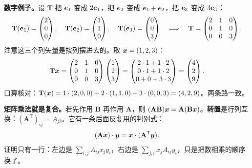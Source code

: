 \documentclass[11pt]{ctexart}
\newcommand{\ten}[1]{\mathbf{#1}}
\let\origsubhdr\subhdr
\renewcommand{\subhdr}[1]{\par\needspace{3\baselineskip}\origsubhdr{#1}}
\begin{document}
\textbf{数字例子。}设 $\ten T$ 把 $\boldsymbol{e}_1$ 变成 $2\boldsymbol{e}_1$，把 $\boldsymbol{e}_2$ 变成 $\boldsymbol{e}_1+\boldsymbol{e}_2$，把 $\boldsymbol{e}_3$ 变成 $3\boldsymbol{e}_3$：
\[
\ten T(\vect e_1)=\begin{pmatrix}2\\0\\0\end{pmatrix},\quad
\ten T(\vect e_2)=\begin{pmatrix}1\\1\\0\end{pmatrix},\quad
\ten T(\vect e_3)=\begin{pmatrix}0\\0\\3\end{pmatrix}
\quad\Longrightarrow\quad
\ten T=\begin{pmatrix}2&1&0\\0&1&0\\0&0&3\end{pmatrix}.
\]
注意这三个列矢量是按列摆进去的。取 $\boldsymbol{x}=(1,2,3)$：
\[
\ten T\vect x=\begin{pmatrix}2&1&0\\0&1&0\\0&0&3\end{pmatrix}\begin{pmatrix}1\\2\\3\end{pmatrix}
=\begin{pmatrix}2\cdot1+1\cdot2\\0\cdot1+1\cdot2\\0+0+3\cdot3\end{pmatrix}=\begin{pmatrix}4\\2\\9\end{pmatrix}.
\]
口算核对：$\ten T(\vect x)=1\cdot(2,0,0)+2\cdot(1,1,0)+3\cdot(0,0,3)=(4,2,9)$。两条路一致。

\textbf{矩阵乘法就是复合。}若先作用 $\ten B$ 再作用 $\ten A$，则 $(\ten A\ten B)\vect x=\ten A(\ten B\vect x)$。\textbf{转置}是行列互换：$(\ten A^{\mathsf T})_{ij}=A_{ji}$。它有一条后面反复用的判别式：
\[
(\ten A\vect x)\cdot\vect y=\vect x\cdot(\ten A^{\mathsf T}\vect y).
\]
证明只有一行：左边是 $\sum_{i,j}A_{ij}x_jy_i$，右边是 $\sum_{j,i}x_jA_{ij}y_i$，只是把数相乘的顺序换了。

\label{subsec:changebasis}
\end{document}
